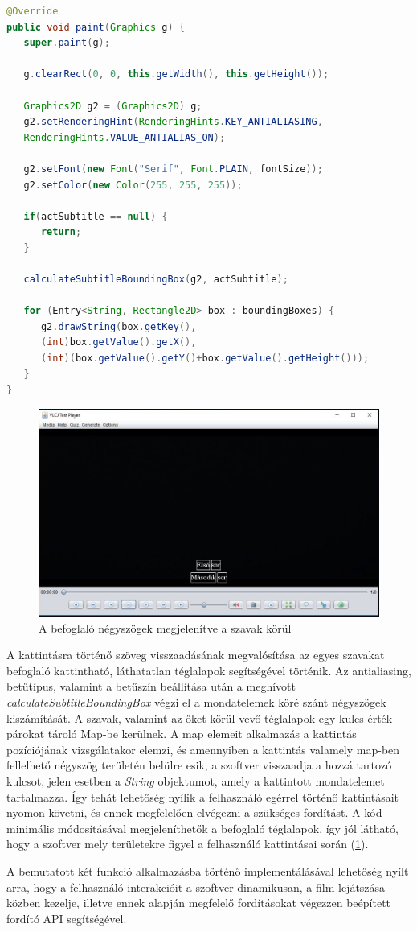 \begin{spacing}{1.25}
\begin{lstlisting}[caption=A felirat megjelenítése, language=java, label={lst:felirat_megj}]
@Override
public void paint(Graphics g) {
   super.paint(g);

   g.clearRect(0, 0, this.getWidth(), this.getHeight());

   Graphics2D g2 = (Graphics2D) g;
   g2.setRenderingHint(RenderingHints.KEY_ANTIALIASING,
   RenderingHints.VALUE_ANTIALIAS_ON);

   g2.setFont(new Font("Serif", Font.PLAIN, fontSize));
   g2.setColor(new Color(255, 255, 255));

   if(actSubtitle == null) {
      return;
   }
   
   calculateSubtitleBoundingBox(g2, actSubtitle);

   for (Entry<String, Rectangle2D> box : boundingBoxes) {
      g2.drawString(box.getKey(),
      (int)box.getValue().getX(),
      (int)(box.getValue().getY()+box.getValue().getHeight()));
   }
}
\end{lstlisting}
\end{spacing}

\begin{figure}[h!]
  \includegraphics[width=\linewidth]{images/subtitle_boxes.jpg}
  \caption{A befoglaló négyszögek megjelenítve a szavak körül}
  \label{fig:subtitle_boxes}
\end{figure}

A kattintásra történő szöveg visszaadásának megvalósítása az egyes szavakat befoglaló kattintható, láthatatlan téglalapok segítségével történik. Az antialiasing, betűtípus, valamint a betűszín beállítása után a meghívott \textit{calculateSubtitleBoundingBox} végzi el a mondatelemek köré szánt négyszögek kiszámítását. A szavak, valamint az őket körül vevő téglalapok egy kulcs-érték párokat tároló Map-be kerülnek. A map elemeit alkalmazás a kattintás pozíciójának vizsgálatakor elemzi, és amennyiben a kattintás valamely map-ben fellelhető négyszög területén belülre esik, a szoftver visszaadja a hozzá tartozó kulcsot, jelen esetben a \textit{String} objektumot, amely a kattintott mondatelemet tartalmazza. Így tehát lehetőség nyílik a felhasználó egérrel történő kattintásait nyomon követni, és ennek megfelelően elvégezni a szükséges fordítást. A kód minimális módosításával megjeleníthetők a befoglaló téglalapok, így jól látható, hogy a szoftver mely területekre figyel a felhasználó kattintásai során (\ref{fig:subtitle_boxes}).

A bemutatott két funkció alkalmazásba történő implementálásával lehetőség nyílt arra, hogy a felhasználó interakcióit a szoftver dinamikusan, a film lejátszása közben kezelje, illetve ennek alapján megfelelő fordításokat végezzen beépített fordító API segítségével.

